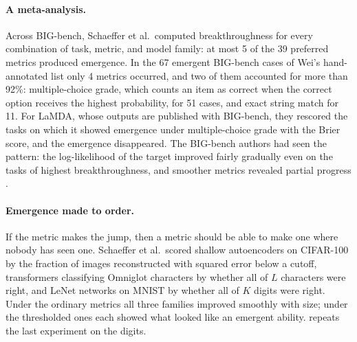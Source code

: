 \begin{refsection}
\paragraph{A meta-analysis.} Across BIG-bench, Schaeffer et al.\ computed breakthroughness for every combination of task, metric, and model family: at most 5 of the 39 preferred metrics produced emergence. In the 67 emergent BIG-bench cases of Wei's hand-annotated list only 4 metrics occurred, and two of them accounted for more than 92\%: multiple-choice grade, which counts an item as correct when the correct option receives the highest probability, for 51 cases, and exact string match for 11. For LaMDA, whose outputs are published with BIG-bench, they rescored the tasks on which it showed emergence under multiple-choice grade with the Brier score, and the emergence disappeared. The BIG-bench authors had seen the pattern: the log-likelihood of the target improved fairly gradually even on the tasks of highest breakthroughness, and smoother metrics revealed partial progress \parencite{SrivastavaEtAl2023}.

\paragraph{Emergence made to order.} If the metric makes the jump, then a metric should be able to make one where nobody has seen one. Schaeffer et al.\ scored shallow autoencoders on CIFAR-100 by the fraction of images reconstructed with squared error below a cutoff, transformers classifying Omniglot characters by whether all of $L$ characters were right, and LeNet networks on MNIST by whether all of $K$ digits were right. Under the ordinary metrics all three families improved smoothly with size; under the thresholded ones each showed what looked like an emergent ability.  repeats the last experiment on the digits.


\end{refsection}
